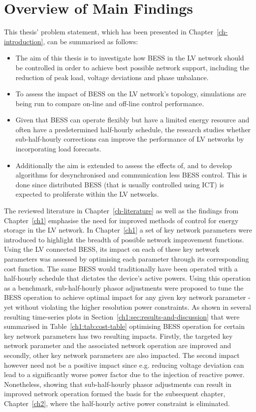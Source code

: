\section{Overview of Main Findings}
\label{ch-conclusion:main-findings}

This thesis' problem statement, which has been presented in Chapter~\ref{ch-introduction}, can be summarised as follows:

\begin{itemize}
	\item
	The aim of this thesis is to investigate how BESS in the LV network should be controlled in order to achieve best possible network support, including the reduction of peak load, voltage deviations and phase unbalance.
	\item 
	To assess the impact of BESS on the LV network's topology, simulations are being run to compare on-line and off-line control performance.
	\item
	Given that BESS can operate flexibly but have a limited energy resource and often have a predetermined half-hourly schedule, the research studies whether sub-half-hourly corrections can improve the performance of LV networks by incorporating load forecasts.
	\item
	Additionally the aim is extended to assess the effects of, and to develop algorithms for desynchronised and communication less BESS control.
	This is done since distributed BESS (that is usually controlled using ICT) is expected to proliferate within the LV networks.
\end{itemize}

The reviewed literature in Chapter~\ref{ch-literature} as well as the findings from Chapter~\ref{ch1} emphasise the need for improved methods of control for energy storage in the LV network.
In Chapter~\ref{ch1} a set of key network parameters were introduced to highlight the breadth of possible network improvement functions.
Using the LV connected BESS, its impact on each of these key network parameters was assessed by optimising each parameter through its corresponding cost function.
The same BESS would traditionally have been operated with a half-hourly schedule that dictates the device's active powers.
Using this operation as a benchmark, sub-half-hourly phasor adjustments were proposed to tune the BESS operation to achieve optimal impact for any given key network parameter - yet without violating the higher resolution power constraints.
As shown in several resulting time-series plots in Section~\ref{ch1:sec:results-and-discussion} that were summarised in Table~\ref{ch1:tab:cost-table} optimising BESS operation for certain key network parameters has two resulting impacts.
Firstly, the targeted key network parameter and the associated network operation are improved and secondly, other key network parameters are also impacted.
The second impact however need not be a positive impact since e.g. reducing voltage deviation can lead to a significantly worse power factor due to the injection of reactive power.
Nonetheless, showing that sub-half-hourly phasor adjustments can result in improved network operation formed the basis for the subsequent chapter, Chapter~\ref{ch2}, where the half-hourly active power constraint is  eliminated.

